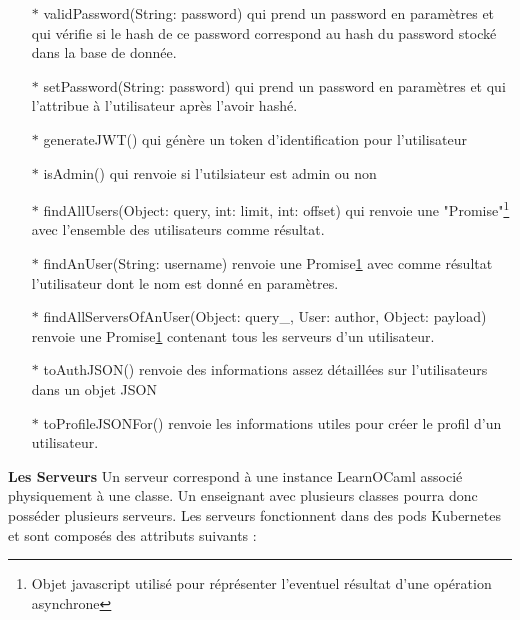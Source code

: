 \documentclass{article}
\begin{document}
\begin{itemize}
	\item[$\ast$]validPassword(String: password) qui prend un password en paramètres et qui vérifie si le hash de ce password correspond au hash du password stocké dans la base de donnée.
	\item[$\ast$]setPassword(String: password) qui prend un password en paramètres et qui l'attribue à l'utilisateur après l'avoir hashé.
	\item[$\ast$]generateJWT() qui génère un token d'identification pour l'utilisateur
	\item[$\ast$]isAdmin() qui renvoie si l'utilsiateur est admin ou non
	\item[$\ast$]findAllUsers(Object: query, int: limit, int: offset) qui renvoie une "Promise"\footnote{\label{promise}Objet javascript utilisé pour réprésenter l'eventuel résultat d'une opération asynchrone} avec l'ensemble des utilisateurs comme résultat.
	\item[$\ast$]findAnUser(String: username) renvoie une Promise\ref{promise} avec comme résultat l'utilisateur dont le nom est donné en paramètres.
	\item[$\ast$]findAllServersOfAnUser(Object: query\_, User: author, Object: payload) renvoie une Promise\ref{promise} contenant tous les serveurs d'un utilisateur.
	\item[$\ast$]toAuthJSON() renvoie des informations assez détaillées sur l'utilisateurs dans un objet JSON
	\item[$\ast$]toProfileJSONFor() renvoie les informations utiles pour créer le profil d'un utilisateur.
\end{itemize}
\textbf{Les Serveurs}
\newline
\newline
Un serveur correspond à une instance LearnOCaml associé physiquement à une classe. Un enseignant avec plusieurs classes pourra donc posséder plusieurs serveurs. Les serveurs fonctionnent dans des pods Kubernetes et sont composés des attributs suivants :
\end{document}
